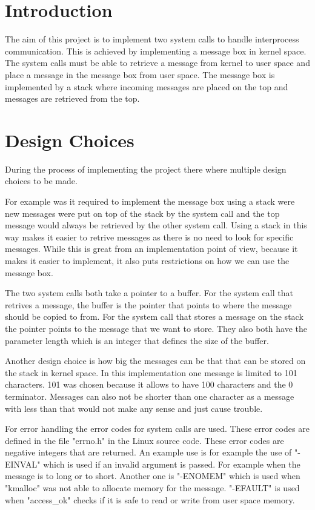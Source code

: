 \documentclass[12pt,a4paper]{report}
\author{Jan Lucca Thümmel}
\begin{document}
\section{Introduction}
The aim of this project is to implement two system calls to handle interprocess communication. This is achieved by implementing a message box in kernel space. The system calls must be able to retrieve a message from kernel to user space and place a message in the message box from user space. The message box is implemented by a stack where incoming messages are placed on the top and messages are retrieved from the top.

\section{Design Choices}
During the process of implementing the project there where multiple design choices to be made.  

For example was it required to implement the message box using a stack were new messages were put on top of the stack by the system call and the top message would always be retrieved by the other system call. Using a stack in this way makes it easier to retrive messages as there is no need to look for specific messages. While this is great from an implementation point of view, because it makes it easier to implement, it also puts restrictions on how we can use the message box.

The two system calls both take a pointer to a buffer. For the system call that retrives a message, the buffer is the pointer that points to where the message should be copied to from. For the system call that stores a message on the stack the pointer points to the message that we want to store. They also both have the parameter length which is an integer that defines the size of the buffer.

Another design choice is how big the messages can be that that can be stored on the stack in kernel space. In this implementation one message is limited to 101 characters. 101 was chosen because it allows to have 100 characters and the 0 terminator. Messages can also not be shorter than one character as a message with less than that would not make any sense and just cause trouble.

For error handling the error codes for system calls are used. These error codes are defined in the file "errno.h" in the Linux source code. These error codes are negative integers that are returned. An example use is for example the use of "-EINVAL" which is used if an invalid argument is passed. For example when the message is to long or to short. Another one is "-ENOMEM" which is used when "kmalloc" was not able to allocate memory for the message. "-EFAULT" is used when "access\_ok" checks if it is safe to read or write from user space memory.
\end{document}
